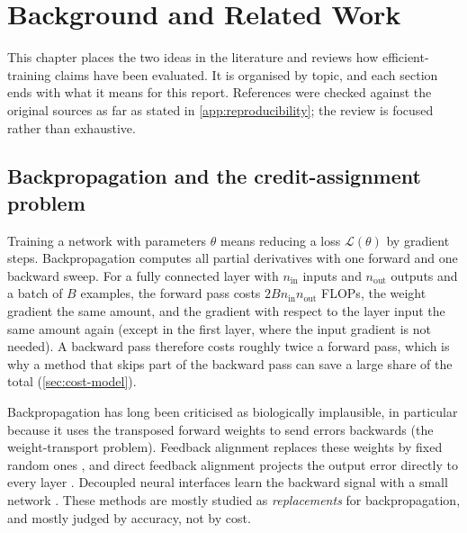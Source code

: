 \chapter{Background and Related Work}\label{ch:background}

This chapter places the two ideas in the literature and reviews how efficient-training claims have been evaluated. It is organised by topic, and each section ends with what it means for this report. References were checked against the original sources as far as stated in \cref{app:reproducibility}; the review is focused rather than exhaustive.

\section{Backpropagation and the credit-assignment problem}
Training a network with parameters $\theta$ means reducing a loss $\mathcal{L}(\theta)$ by gradient steps. Backpropagation \citep{rumelhart1986learning} computes all partial derivatives with one forward and one backward sweep. For a fully connected layer with $n_{\mathrm{in}}$ inputs and $n_{\mathrm{out}}$ outputs and a batch of $B$ examples, the forward pass costs $2Bn_{\mathrm{in}}n_{\mathrm{out}}$ FLOPs, the weight gradient the same amount, and the gradient with respect to the layer input the same amount again (except in the first layer, where the input gradient is not needed). A backward pass therefore costs roughly twice a forward pass, which is why a method that skips part of the backward pass can save a large share of the total (\cref{sec:cost-model}).

Backpropagation has long been criticised as biologically implausible, in particular because it uses the transposed forward weights to send errors backwards (the weight-transport problem). Feedback alignment replaces these weights by fixed random ones \citep{lillicrap2016random}, and direct feedback alignment projects the output error directly to every layer \citep{nokland2016direct}. Decoupled neural interfaces learn the backward signal with a small network \citep{jaderberg2017decoupled}. These methods are mostly studied as \emph{replacements} for backpropagation, and mostly judged by accuracy, not by cost.

